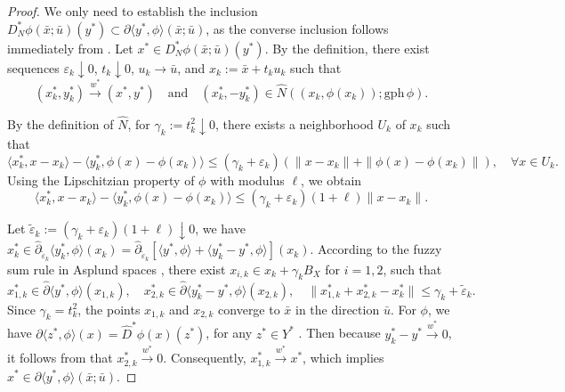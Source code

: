 \documentclass[12pt,twoside,reqno]{amsart}
\theoremstyle{definition}
\numberwithin{equation}{section}
\begin{document}
\begin{proof}
We only need to establish the inclusion $D_N^* \phi(\bar{x}; \bar{u})(y^*) \subset \partial \langle y^*, \phi \rangle (\bar{x}; \bar{u})$, as the converse inclusion follows immediately from \cite[Theorem~1.90]{Mordukhovich2006variational}.  
Let $x^* \in D_N^* \phi(\bar{x}; \bar{u})(y^*)$. By the definition, there exist sequences $\varepsilon_k \downarrow 0$, $t_k \downarrow 0$, $u_k \to \bar{u}$, and $x_k := \bar{x} + t_k u_k$ such that
\begin{equation*}
    (x_k^*, y_k^*) \xrightarrow{w^*} (x^*, y^*) \quad \text{and} \quad (x_k^*, -y_k^*) \in \widehat{N}((x_k, \phi(x_k)); \mathrm{gph}\, \phi).
\end{equation*}

By the definition of $\widehat{N}$, for $\gamma_k := t_k^2 \downarrow 0$, there exists a neighborhood $U_k$ of $x_k$ such that
\begin{equation*}
    \langle x_k^*, x - x_k \rangle - \langle y_k^*, \phi(x) - \phi(x_k) \rangle \le (\gamma_k + \varepsilon_k) (\|x - x_k\| + \|\phi(x) - \phi(x_k)\|), \quad \forall x \in U_k.
\end{equation*}
Using the Lipschitzian property of $\phi$ with modulus $\ell$, we obtain
\begin{equation} \label{eq:w_lip_estimate}
    \langle x_k^*, x - x_k \rangle - \langle y_k^*, \phi(x) - \phi(x_k) \rangle \le (\gamma_k + \varepsilon_k)(1 + \ell) \|x - x_k\|.
\end{equation}

Let $\tilde{\varepsilon}_k := (\gamma_k + \varepsilon_k)(1 + \ell) \downarrow 0$, we have $x_k^* \in \widehat{\partial}_{\tilde{\varepsilon}_k} \langle y_k^*, \phi \rangle (x_k) = \widehat{\partial}_{\tilde{\varepsilon}_k} [\langle y^*, \phi \rangle + \langle y_k^* - y^*, \phi \rangle] (x_k)$. According to the fuzzy sum rule in Asplund spaces \cite[Theorem~2.33(b)]{Mordukhovich2006variational}, there exist $x_{i,k} \in x_k + \gamma_k B_X$ for $i=1, 2$, such that
\begin{equation*}
    x_{1,k}^* \in \widehat{\partial} \langle y^*, \phi \rangle (x_{1,k}), \quad x_{2,k}^* \in \widehat{\partial} \langle y_k^* - y^*, \phi \rangle (x_{2,k}), \quad \|x_{1,k}^* + x_{2,k}^* - x_k^*\| \le \gamma_k+\tilde{\varepsilon}_k.
\end{equation*}
Since $\gamma_k = t_k^2$, the points $x_{1,k}$ and $x_{2,k}$ converge to $\bar{x}$ in the direction $\bar{u}$. For $\phi$, we have $\widehat{\partial} \langle z^*, \phi \rangle (x) = \widehat{D}^* \phi(x)(z^*)$, for any $z^*\in Y^*$ \cite[(3.37)]{Mordukhovich2006variational}. 
Then because $y_k^* - y^* \xrightarrow{w^*} 0$, it follows from \cite[Lemma~3.27(i)]{Mordukhovich2006variational} that $x_{2,k}^* \xrightarrow{w^*} 0$. Consequently, $x_{1,k}^* \xrightarrow{w^*} x^*$, which implies $x^* \in \partial \langle y^*, \phi \rangle (\bar{x}; \bar{u})$. 
\end{proof}
\end{document}
